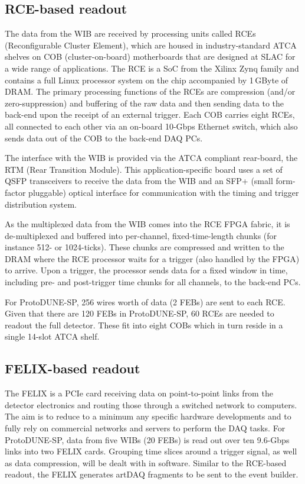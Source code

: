 \subsection{RCE-based readout}
The data from the WIB are received by processing units called RCEs (Reconfigurable Cluster Element), 
\cite{slac:rce}
which are housed in industry-standard
ATCA shelves on COB (cluster-on-board) motherboards that are designed
at SLAC for a wide range of applications.   The RCE is a SoC 
from the
Xilinx Zynq family and contains a full Linux processor system on the chip
accompanied by 1\,GByte of DRAM.   The primary processing functions of the
RCEs are compression (and/or zero-suppression) and buffering
of the raw data and then sending data to the back-end upon the receipt of
an external trigger.  Each COB carries eight RCEs, all connected to each
other via an on-board 10-Gbps Ethernet switch, which also sends data out
of the COB to the back-end DAQ PCs.

The interface with the WIB is provided via the ATCA compliant rear-board, the RTM (Rear Transition Module).  
This application-specific board uses a set of QSFP transceivers to receive
the data from the WIB and an SFP+ (small form-factor pluggable)
 optical interface for communication
with the timing and trigger distribution system.

As the multiplexed data from the WIB comes into the RCE FPGA fabric,
it is de-multiplexed and buffered into per-channel, fixed-time-length 
chunks (for instance 512- or 1024-ticks).  These chunks are
compressed and written to the DRAM where the RCE processor waits
for a trigger (also handled by the FPGA) to arrive.  Upon a trigger, the
processor sends data for a fixed window in time, including pre- and post-trigger time chunks
for all channels, to the back-end PCs.  

For ProtoDUNE-SP, 256 wires worth of data (2 FEBs) are sent to each RCE.
Given that there are 120 FEBs in ProtoDUNE-SP, 60 RCEs are needed to
readout the full detector.  These fit into eight COBs which in turn
reside in a single 14-slot ATCA shelf.

\subsection{FELIX-based readout}
The FELIX is a PCIe card receiving data on point-to-point links from
the detector electronics and routing those through a switched network
to computers.  The aim is to reduce to a minimum any specific hardware
developments and to fully rely on commercial networks and servers to
perform the DAQ tasks.  For ProtoDUNE-SP, data from five WIBs (20 FEBs) is read out over ten 9.6-Gbps links into two FELIX cards.  Grouping
time slices around a trigger signal, as well as data compression, will be
dealt with in software. Similar to the RCE-based readout, the FELIX 
generates artDAQ fragments to be sent to the event builder.


